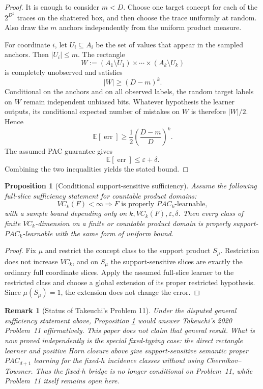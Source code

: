 \documentclass[11pt]{article}
\newtheorem{proposition}[theorem]{Proposition}
\newtheorem{remark}[theorem]{Remark}
\newcommand{\eps}{\varepsilon}
\begin{document}
\begin{proof}
It is enough to consider \(m<D\).  Choose one target concept for each of the
\(2^{D^k}\) traces on the shattered box, and then choose the trace uniformly
at random.  Also draw the \(m\) anchors independently from the uniform
product measure.

For coordinate \(i\), let \(U_i\subseteq A_i\) be the set of values that
appear in the sampled anchors.  Then \(|U_i|\le m\).  The rectangle
\[
 W:=(A_1\setminus U_1)\times\cdots\times(A_k\setminus U_k)
\]
is completely unobserved and satisfies
\[
 |W|\ge(D-m)^k.
\]
Conditional on the anchors and on all observed labels, the random target
labels on \(W\) remain independent unbiased bits.  Whatever hypothesis the
learner outputs, its conditional expected number of mistakes on \(W\) is
therefore \(|W|/2\).  Hence
\[
 \mathbb E[\operatorname{err}]
 \ge
 \frac12\left(\frac{D-m}{D}\right)^k.
\]
The assumed PAC guarantee gives
\[
 \mathbb E[\operatorname{err}]\le\eps+\delta.
\]
Combining the two inequalities yields the stated bound.
\end{proof}

\begin{proposition}[Conditional support-sensitive sufficiency]
\label{prop:conditional-support-pac}
Assume the following full-slice sufficiency statement for countable product
domains:
\[
 VC_k(F)<\infty
 \Longrightarrow
 F\text{ is properly }PAC_k\text{-learnable},
\]
with a sample bound depending only on \(k,VC_k(F),\eps,\delta\).
Then every class of finite \(VC_k\)-dimension on a finite or countable
product domain is properly support-\(PAC_k\)-learnable with the same form of
uniform bound.
\end{proposition}

\begin{proof}
Fix \(\mu\) and restrict the concept class to the support product
\(S_\mu\).  Restriction does not increase \(VC_k\), and on \(S_\mu\) the
support-sensitive slices are exactly the ordinary full coordinate slices.
Apply the assumed full-slice learner to the restricted class and choose a
global extension of its proper restricted hypothesis.  Since
\(\mu(S_\mu)=1\), the extension does not change the error.
\end{proof}

\begin{remark}[Status of Takeuchi's Problem 11]
Under the disputed general sufficiency statement above, Proposition
\ref{prop:conditional-support-pac} would answer Takeuchi's 2020 Problem~11
affirmatively.  This paper does not claim that general result.  What is now
proved independently is the special fixed-typing case: the direct rectangle
learner and positive Horn closure above give support-sensitive semantic
proper \(PAC_{d+1}\) learning for the fixed-\(h\) incidence classes without
using Chernikov--Towsner.  Thus the fixed-\(h\) bridge is no longer
conditional on Problem~11, while Problem~11 itself remains open here.
\end{remark}
\end{document}
